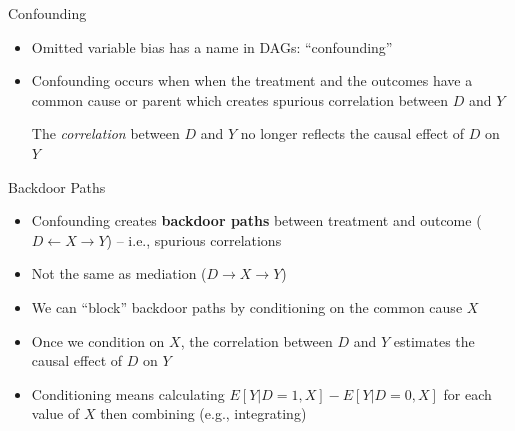 \documentclass{beamer}
\begin{document}
\begin{frame}{Confounding}

  \begin{itemize}
    \item Omitted variable bias has a name in DAGs: ``confounding''
    \item Confounding occurs when when the treatment and the outcomes have a common cause or parent which creates spurious correlation between $D$ and $Y$

          \begin{center}
          \end{center}

          The \emph{correlation} between $D$ and $Y$ no longer reflects the causal effect of $D$ on $Y$
  \end{itemize}
\end{frame}

\begin{frame}{Backdoor Paths}

  \begin{itemize}
    \item Confounding creates \textbf{backdoor paths} between treatment and outcome ($D\leftarrow X\rightarrow Y$) -- i.e., spurious correlations
    \item Not the same as mediation ($D \rightarrow X \rightarrow Y$)
    \item We can ``block'' backdoor paths by conditioning on the common cause $X$
    \item Once we condition on $X$, the correlation between $D$ and $Y$ estimates the causal effect of $D$ on $Y$
    \item Conditioning means calculating $E[Y|D=1,X]-E[Y|D=0,X]$ for each value of $X$ then combining (e.g., integrating)

  \end{itemize}

  \begin{center}
  \end{center}

\end{frame}
\end{document}
